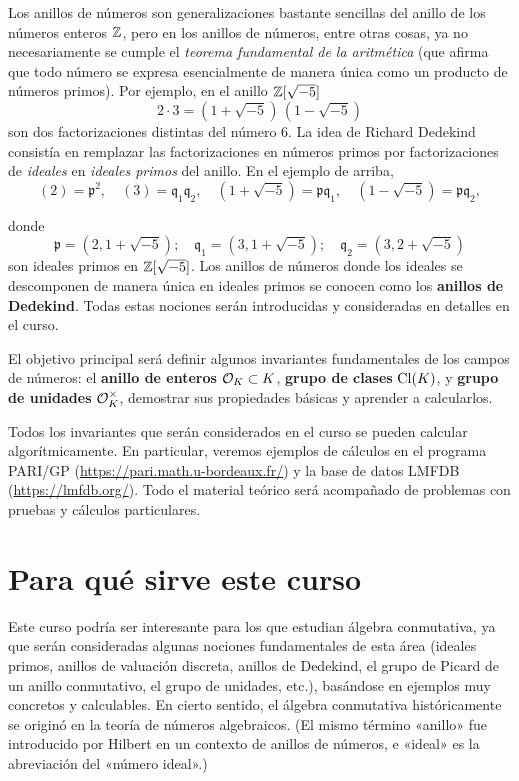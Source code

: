 Los anillos de números son generalizaciones bastante sencillas del anillo de los
números enteros $\mathbb{Z}$, pero en los anillos de números, entre otras cosas,
ya no necesariamente se cumple el \emph{teorema fundamental de la aritmética}
(que afirma que todo número se expresa esencialmente de manera única como un
producto de números primos). Por ejemplo, en el anillo $\mathbb{Z} [\sqrt{-5}]$
$$2\cdot 3 = (1 + \sqrt{-5})\,(1 - \sqrt{-5})$$
son dos factorizaciones distintas del número $6$. La idea de Richard Dedekind
consistía en remplazar las factorizaciones en números primos por factorizaciones
de \emph{ideales} en \emph{ideales primos} del anillo. En el ejemplo de arriba,
\[ (2) = \mathfrak{p}^2, \quad
   (3) = \mathfrak{q}_1 \mathfrak{q}_2, \quad
   (1 + \sqrt{-5}) = \mathfrak{p} \mathfrak{q}_1, \quad
   (1 - \sqrt{-5}) = \mathfrak{p} \mathfrak{q}_2, \]

donde
\[ \mathfrak{p} = (2, 1 + \sqrt{-5}); \quad
   \mathfrak{q}_1 = (3, 1 + \sqrt{-5}); \quad
   \mathfrak{q}_2 = (3, 2 + \sqrt{-5}) \]
son ideales primos en $\mathbb{Z} [\sqrt{-5}]$. Los anillos de números donde los
ideales se descomponen de manera única en ideales primos se conocen como
los \textbf{anillos de Dedekind}. Todas estas nociones serán introducidas y
consideradas en detalles en el curso.

El objetivo principal será definir algunos invariantes fundamentales de los
campos de números: el \textbf{anillo de enteros} $\mathcal{O}_K \subset K$,
\textbf{grupo de clases} $\operatorname{Cl} (K)$, y \textbf{grupo de unidades}
$\mathcal{O}_K^\times$, demostrar sus propiedades básicas y aprender a
calcularlos.

Todos los invariantes que serán considerados en el curso se pueden calcular
algorítmicamente. En particular, veremos ejemplos de cálculos en el programa
PARI/GP (\url{https://pari.math.u-bordeaux.fr/}) y la base de datos LMFDB
(\url{https://lmfdb.org/}). Todo el material teórico será acompañado de
problemas con pruebas y cálculos particulares.

\section{Para qué sirve este curso}

Este curso podría ser interesante para los que estudian álgebra conmutativa,
ya que serán consideradas algunas nociones fundamentales de esta área (ideales
primos, anillos de valuación discreta, anillos de Dedekind, el grupo de Picard
de un anillo conmutativo, el grupo de unidades, etc.), basándose en ejemplos muy
concretos y calculables. En cierto sentido, el álgebra conmutativa
históricamente se originó en la teoría de números algebraicos. (El mismo término
«anillo» fue introducido por Hilbert en un contexto de anillos de números,
e «ideal» es la abreviación del «número ideal».)

